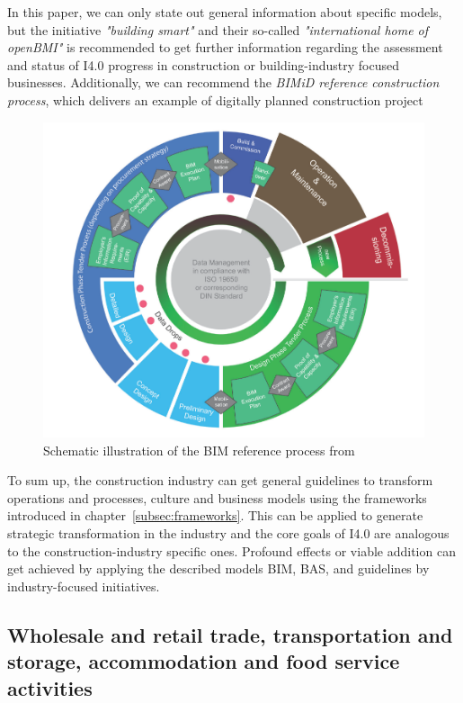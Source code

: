 In this paper, we can only state out general information about specific models, but the initiative \emph{"building smart"} \cite{buildingsmart:2016} %
and their so-called \emph{"international home of openBMI"} is recommended to get further information regarding the assessment and status of \ac{I4.0} progress in construction or building-industry focused businesses. Additionally, we can recommend the \emph{BIMiD reference construction process}, which delivers an example of digitally planned construction project \cite{bimidReferencemodel:2016} %

\begin{figure}[H]
\centering
\includegraphics[width=1\columnwidth]{images/construction-BIM-reference-process.PNG}
\caption{Schematic illustration of the BIM reference process from \cite{FederalMinRoadMapConstruction}}
\end{figure}

To sum up, the construction industry can get general guidelines to transform operations and processes, culture and business models using the frameworks introduced in chapter~\ref{subsec:frameworks}. This can be applied to generate strategic transformation in the industry and the core goals of \ac{I4.0} are analogous to the construction-industry specific ones. Profound effects or viable addition can get achieved by applying the described models \ac{BIM}, \ac{BAS}, and guidelines by industry-focused initiatives.

\subsection{Wholesale and retail trade, transportation and storage, accommodation and food service activities}

